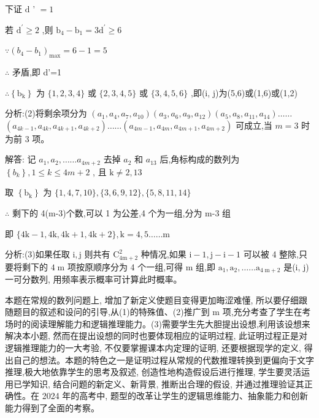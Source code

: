 \documentclass[10pt]{article}
\begin{document}
下证 \(\mathrm{d}\) ’ \(= 1\)

若 \({\mathrm{d}}^{\prime } \geq  2\) ,则 \({\mathrm{b}}_{4} - {\mathrm{b}}_{1} = 3{\mathrm{d}}^{\prime } \geq  6\)

\(\because {\left( {b}_{4} - {b}_{1}\right) }_{\max } = 6 - 1 = 5\)

\(\therefore\) 矛盾,即 d’=1

\(\therefore \left\{  {\mathrm{b}}_{\mathrm{k}}\right\}\) 为 \(\{ 1,2,3,4\}\) 或 \(\{ 2,3,4,5\}\) 或 \(\{ 3,4,5,6\}\) ,即(i, j)为(5,6)或(1,6)或(1,2)

分析:(2)将剩余项分为 \(\left( {{a}_{1},{a}_{4},{a}_{7},{a}_{10}}\right) \left( {{a}_{3},{a}_{6},{a}_{9},{a}_{12}}\right) \left( {{a}_{5},{a}_{8},{a}_{11},{a}_{14}}\right) \ldots \ldots\)  \(\left( {{a}_{{4k} - 1},{a}_{4k},{a}_{{4k} + 1},{a}_{{4k} + 2}}\right) \ldots \ldots \left( {{a}_{{4m} - 1},{a}_{4m},{a}_{{4m} + 1},{a}_{{4m} + 2}}\right)\) 可成立,当 \(m = 3\) 时为前 3 项。

解答: 记 \({a}_{1},{a}_{2},\ldots \ldots {a}_{{4m} + 2}\) 去掉 \({a}_{2}\) 和 \({a}_{13}\) 后,角标构成的数列为 \(\left\{  {b}_{k}\right\}  ,1 \leq  k \leq  {4m} + 2\) , 且 \(\mathrm{k} \neq  2,{13}\)

取 \(\left\{  {\mathrm{b}}_{\mathrm{k}}\right\}\) 为 \(\{ 1,4,7,{10}\} ,\{ 3,6,9,{12}\} ,\{ 5,8,{11},{14}\}\)

\(\therefore\) 剩下的 4(m-3)个数,可以 1 为公差,4 个为一组,分为 m-3 组

即 \(\{ 4\mathrm{k} - 1,4\mathrm{k},4\mathrm{k} + 1,4\mathrm{k} + 2\} ,\mathrm{k} = 4,5\ldots \ldots \mathrm{m}\)

分析:(3)如果任取 \(\mathrm{i},\mathrm{j}\) 则共有 \({\mathrm{C}}_{4\mathrm{m} + 2}^{2}\) 种情况,如果 \(\mathrm{i} - 1,\mathrm{j} - \mathrm{i} - 1\) 可以被 4 整除,只要将剩下的 \(4\mathrm{\;m}\) 项按原顺序分为 4 个一组,可得 \(\mathrm{m}\) 组,即 \({\mathrm{a}}_{1},{\mathrm{a}}_{2},\ldots \ldots {\mathrm{a}}_{4\mathrm{\;m} + 2}\) 是(i, j)一可分数列, 用频率表示概率可计算此时概率。

本题在常规的数列问题上, 增加了新定义使题目变得更加晦涩难懂, 所以要仔细跟随题目的叙述和设问的引导,从(1)的特殊值、(2)推广到 \(\mathrm{m}\) 项,充分考查了学生在考场时的阅读理解能力和逻辑推理能力。(3)需要学生先大胆提出设想,利用该设想来解决本小题, 然而在提出设想的同时也要体现相应的证明过程, 此证明过程正是对逻辑推理能力的一大考验, 不仅要掌握课本内定理的证明, 还要根据现学的定义, 得出自己的想法。本题的特色之一是证明过程从常规的代数推理转换到更偏向于文字推理,极大地依靠学生的思考及叙述, 创造性地构造假设后进行推理, 学生要灵活运用已学知识, 结合问题的新定义、新背景, 推断出合理的假设, 并通过推理验证其正确性。在 2024 年的高考中, 题型的改革让学生的逻辑思维能力、抽象能力和创新能力得到了全面的考察。
\end{document}
